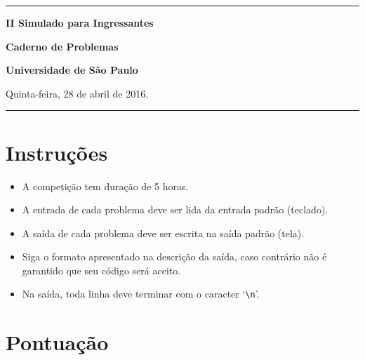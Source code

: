 \documentclass[a4paper,11pt]{article}
\begin{document}

\begin{center}
\noindent

\hrule

\vspace{3.0cm}

\begin{Huge}
  {\bf II Simulado para Ingressantes}
\end{Huge}

\vspace{6.0cm}

\begin{Huge}
{\bf Caderno de Problemas}
\end{Huge}

\vspace{6.0cm}

\begin{Large}
	{\bf Universidade de São Paulo}
\end{Large}

\vfill


Quinta-feira, 28 de abril de 2016.

\vfill
\hrule
\end{center}

\thispagestyle{empty}

\newpage

\section*{Instruções}

\begin{itemize}
	\item A competição tem duração de 5 horas.
	\item A entrada de cada problema deve ser lida da entrada padrão (teclado).
	\item A saída de cada problema deve ser escrita na saída padrão (tela).
	\item Siga o formato apresentado na descrição da saída, caso contrário não é garantido que seu
	código será aceito.
	\item Na saída, toda linha deve terminar com o caracter `\texttt{\textbackslash n}'.
\end{itemize}

\section*{Pontuação} 
\end{document}
